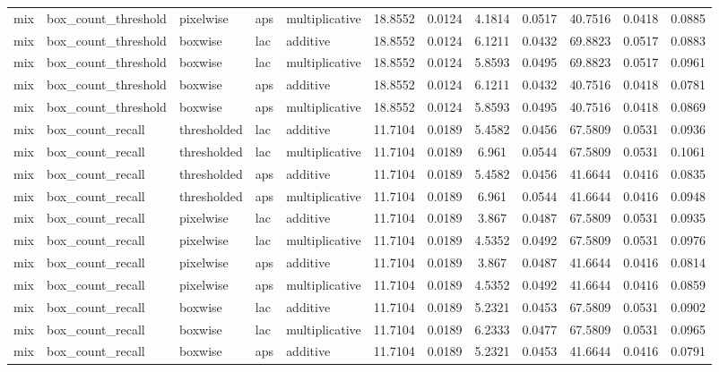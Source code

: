 \begin{table*}[htbp]
\begin{tabular}{@{}lllll rrcrrcr@{}}
mix & box\_count\_threshold & pixelwise & aps & multiplicative & 18.8552 & 0.0124 & 4.1814 & 0.0517 & 40.7516 & 0.0418 & 0.0885 \\
mix & box\_count\_threshold & boxwise & lac & additive & 18.8552 & 0.0124 & 6.1211 & 0.0432 & 69.8823 & 0.0517 & 0.0883 \\
mix & box\_count\_threshold & boxwise & lac & multiplicative & 18.8552 & 0.0124 & 5.8593 & 0.0495 & 69.8823 & 0.0517 & 0.0961 \\
mix & box\_count\_threshold & boxwise & aps & additive & 18.8552 & 0.0124 & 6.1211 & 0.0432 & 40.7516 & 0.0418 & 0.0781 \\
mix & box\_count\_threshold & boxwise & aps & multiplicative & 18.8552 & 0.0124 & 5.8593 & 0.0495 & 40.7516 & 0.0418 & 0.0869 \\
mix & box\_count\_recall & thresholded & lac & additive & 11.7104 & 0.0189 & 5.4582 & 0.0456 & 67.5809 & 0.0531 & 0.0936 \\
mix & box\_count\_recall & thresholded & lac & multiplicative & 11.7104 & 0.0189 & 6.961 & 0.0544 & 67.5809 & 0.0531 & 0.1061 \\
mix & box\_count\_recall & thresholded & aps & additive & 11.7104 & 0.0189 & 5.4582 & 0.0456 & 41.6644 & 0.0416 & 0.0835 \\
mix & box\_count\_recall & thresholded & aps & multiplicative & 11.7104 & 0.0189 & 6.961 & 0.0544 & 41.6644 & 0.0416 & 0.0948 \\
mix & box\_count\_recall & pixelwise & lac & additive & 11.7104 & 0.0189 & 3.867 & 0.0487 & 67.5809 & 0.0531 & 0.0935 \\
mix & box\_count\_recall & pixelwise & lac & multiplicative & 11.7104 & 0.0189 & 4.5352 & 0.0492 & 67.5809 & 0.0531 & 0.0976 \\
mix & box\_count\_recall & pixelwise & aps & additive & 11.7104 & 0.0189 & 3.867 & 0.0487 & 41.6644 & 0.0416 & 0.0814 \\
mix & box\_count\_recall & pixelwise & aps & multiplicative & 11.7104 & 0.0189 & 4.5352 & 0.0492 & 41.6644 & 0.0416 & 0.0859 \\
mix & box\_count\_recall & boxwise & lac & additive & 11.7104 & 0.0189 & 5.2321 & 0.0453 & 67.5809 & 0.0531 & 0.0902 \\
mix & box\_count\_recall & boxwise & lac & multiplicative & 11.7104 & 0.0189 & 6.2333 & 0.0477 & 67.5809 & 0.0531 & 0.0965 \\
mix & box\_count\_recall & boxwise & aps & additive & 11.7104 & 0.0189 & 5.2321 & 0.0453 & 41.6644 & 0.0416 & 0.0791 \\

\end{tabular}
\end{table*}
